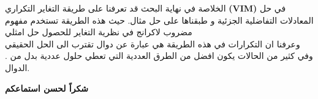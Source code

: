 	\begin{frame}{الخلاصة}		
		في نهاية البحث قد تعرفنا على طريقة التغاير التكراري  
		\textbf{(VIM)} في حل المعادلات التفاضلية الجزئية و طبقناها على حل مثال. حيث هذه الطريقة تستخدم مفهوم مضروب لاكرانج في نظرية التغاير للحصول حل امثلي \\
		وعرفنا ان التكرارات في هذه الطريقة هي عبارة عن دوال تقترب الى الحل الحقيقي
		\\ . وفي كثير من الحالات يكون افضل من الطرق العددية التي تعطي حلول عددية بدل من الدوال.
	\end{frame}
	
	\begin{frame}
		\Huge
		\begin{center}
			\textbf{شكراً لحسن استماعكم}
		\end{center}
	\end{frame}

